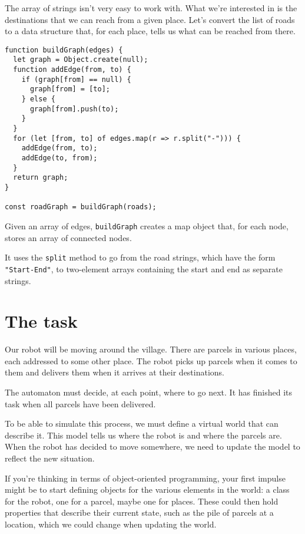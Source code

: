 The array of strings isn't very easy to work with. What we're interested in is the destinations that we can reach from a given place. Let's convert the list of roads to a data structure that, for each place, tells us what can be reached from there.

\begin{lstlisting}
function buildGraph(edges) {
  let graph = Object.create(null);
  function addEdge(from, to) {
    if (graph[from] == null) {
      graph[from] = [to];
    } else {
      graph[from].push(to);
    }
  }
  for (let [from, to] of edges.map(r => r.split("-"))) {
    addEdge(from, to);
    addEdge(to, from);
  }
  return graph;
}

const roadGraph = buildGraph(roads);
\end{lstlisting}
\noindent

Given an array of edges, \lstinline`buildGraph` creates a map object that, for each node, stores an array of connected nodes.

It uses the \lstinline`split` method to go from the road strings, which have the form \lstinline`"Start-End"`, to two-element arrays containing the start and end as separate strings.

\section{The task}

Our robot will be moving around the village. There are parcels in various places, each addressed to some other place. The robot picks up parcels when it comes to them and delivers them when it arrives at their destinations.

The automaton must decide, at each point, where to go next. It has finished its task when all parcels have been delivered.

To be able to simulate this process, we must define a virtual world that can describe it. This model tells us where the robot is and where the parcels are. When the robot has decided to move somewhere, we need to update the model to reflect the new situation.

If you're thinking in terms of object-oriented programming, your first impulse might be to start defining objects for the various elements in the world: a class for the robot, one for a parcel, maybe one for places. These could then hold properties that describe their current state, such as the pile of parcels at a location, which we could change when updating the world.

